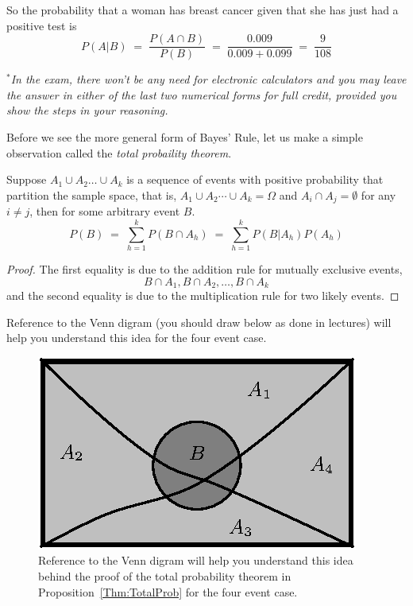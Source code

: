 \begin{example}[Mammogram]
{So the probability that a woman has breast cancer given that
she has just had a positive test is  $$P(A|B)\;=\;\frac{P(A\cap B)}{P(B)}\;=\;\frac{0.009}{0.009+0.099}\;=\;\frac{9}{108}$$

\emph{$^*$In the exam, there won't be any need for electronic calculators and you may leave the answer in either of the last two numerical forms for full credit, provided you show the steps in your reasoning.}
}
\end{example}

Before we see the more general form of Bayes' Rule, let us make a simple observation called the \emph {total probaility theorem}.

\begin{framed}
\begin{prop}\label{Thm:TotalProb}
Suppose $A_1 \cup A_2 \ldots \cup A_k$ is a sequence of events with positive probability that partition the sample space, that is, $A_1\cup A_2 \cdots \cup A_k=\Omega$ and  $A_i \cap A_j = \emptyset$ for any $i \neq j$, then for some arbitrary event $B$.
\begin{equation}\label{E:TotalProb}
P(B) \;= \;\sum_{h=1}^k P(B \cap A_h) \;= \;\sum_{h=1}^k P(B|A_h)P(A_h)
\end{equation}
\end{prop}
\end{framed}
\begin{proof}
The first equality is due to the addition rule for mutually exclusive events, \[B \cap A_1, B \cap A_2, \ldots, B \cap A_k\] and the second equality is due to the multiplication rule for two likely events.
\end{proof}
Reference to the Venn digram (you should draw below as done in lectures) will help you understand this idea for the four event case.

\begin{figure}[htbp]
\begin{center}
\includegraphics{pstricks/totProbThmVennDiagram.eps}
\caption{Reference to the Venn digram will help you understand this idea behind the proof of the total probability theorem in Proposition~\ref{Thm:TotalProb} for the four event case.}
\end{center}
\end{figure}


